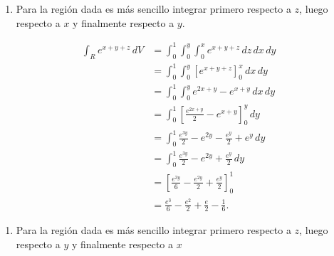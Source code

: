 \documentclass[
  spanish,
  a4paper,
]{scrreport}
\providecommand{\tightlist}{%
  \setlength{\itemsep}{0pt}\setlength{\parskip}{0pt}}
\theoremstyle{definition}
\theoremstyle{remark}
\begin{document}
\begin{tcolorbox}[enhanced jigsaw, arc=.35mm, bottomrule=.15mm, bottomtitle=1mm, breakable, colback=white, colbacktitle=quarto-callout-tip-color!10!white, colframe=quarto-callout-tip-color-frame, coltitle=black, left=2mm, leftrule=.75mm, opacityback=0, opacitybacktitle=0.6, rightrule=.15mm, title=\textcolor{quarto-callout-tip-color}{\faLightbulb}\hspace{0.5em}{Solución}, titlerule=0mm, toprule=.15mm, toptitle=1mm]

\begin{enumerate}
\def\labelenumi{\alph{enumi}.}
\tightlist
\item
  Para la región dada es más sencillo integrar primero respecto a \(z\),
  luego respecto a \(x\) y finalmente respecto a \(y\).
\end{enumerate}

\begin{align*}
\int_R e^{x+y+z}\,dV
&= \int_0^1 \int_0^{y} \int_0^{x} e^{x+y+z}\,dz\,dx\,dy \\  
&= \int_0^1 \int_0^{y} \left[e^{x+y+z}\right]_0^{x}\,dx\,dy \\  
&= \int_0^1 \int_0^{y} e^{2x+y}-e^{x+y}\,dx\,dy \\
&= \int_0^1 \left[\frac{e^{2x+y}}{2}-e^{x+y}\right]_0^{y}\,dy \\
&= \int_0^1 \frac{e^{3y}}{2} - e^{2y} - \frac{e^{y}}{2} + e^{y}\,dy \\
&= \int_0^1 \frac{e^{3y}}{2} - e^{2y} + \frac{e^{y}}{2}\,dy \\
&= \left[\frac{e^{3y}}{6} - \frac{e^{2y}}{2} + \frac{e^{y}}{2}\right]_0^1 \\
&= \frac{e^3}{6} - \frac{e^2}{2} + \frac{e}{2} - \frac{1}{6}.
\end{align*}

\begin{enumerate}
\def\labelenumi{\alph{enumi}.}
\tightlist
\item
  Para la región dada es más sencillo integrar primero respecto a \(z\),
  luego respecto a \(y\) y finalmente respecto a \(x\)
\end{enumerate}


\end{tcolorbox}
\end{document}
